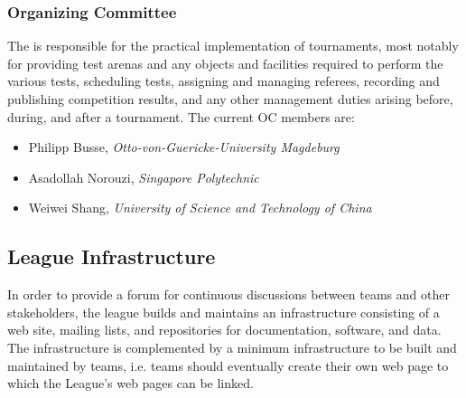 \subsubsection{Organizing Committee}
The  is responsible for the practical implementation of tournaments, most notably for providing test arenas and any objects and facilities required to perform the various tests, scheduling tests, assigning and managing referees, recording and publishing competition results, and any other management duties arising before, during, and after a tournament. The current OC members are:

\begin{itemize}
	\item Philipp Busse, \textit{Otto-von-Guericke-University Magdeburg}
	\item Asadollah Norouzi, \textit{Singapore Polytechnic}
	\item Weiwei Shang, \textit{University of Science and Technology of China}
\end{itemize}





\subsection{League Infrastructure}
In order to provide a forum for continuous discussions between teams and other stakeholders, the league builds and maintains an infrastructure consisting of a web site, mailing lists, and repositories for documentation, software, and data. The infrastructure is complemented by a minimum infrastructure to be built and maintained by teams, i.e. teams should eventually create their own web page to which the \RCAW League's web pages can be linked.

